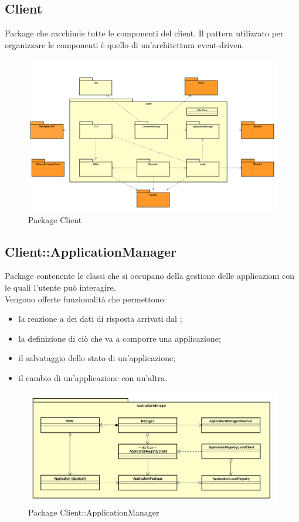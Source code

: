 \subsection{Client}
Package che racchiude tutte le componenti del client. Il pattern utilizzato per organizzare le componenti è quello di un'architettura event-driven.
\begin{figure}[h] \centering \includegraphics[width=\textwidth,height=\textheight,keepaspectratio]{images/diagrams/client/Client/Client.png}
	\caption{Package Client}
\end{figure}
\newpage


\subsection{Client::ApplicationManager}
Package contenente le classi che si occupano della gestione delle applicazioni con le quali l'utente può interagire.\\ Vengono offerte funzionalità che permettono: \begin{itemize} \item la reazione a dei dati di risposta arrivati dal ; \item la definizione di ciò che va a comporre una applicazione; \item il salvataggio dello stato di un'applicazione; \item il cambio di un'applicazione con un'altra. \end{itemize}
\begin{figure}[h] \centering \includegraphics[width=\textwidth,height=\textheight,keepaspectratio]{images/diagrams/client/Client/ApplicationManager.png}
	\caption{Package Client::ApplicationManager}
\end{figure}
\newpage

